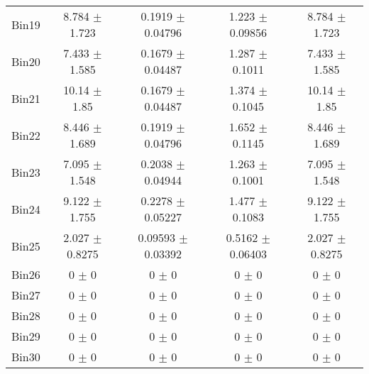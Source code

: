 \begin{tabular}{@{\extracolsep{4pt}}lcccc@{}}
     Bin19 & 8.784 $\pm$ 1.723 & 0.1919 $\pm$ 0.04796 & 1.223 $\pm$ 0.09856 & 8.784 $\pm$ 1.723 \\ 
     Bin20 & 7.433 $\pm$ 1.585 & 0.1679 $\pm$ 0.04487 & 1.287 $\pm$ 0.1011 & 7.433 $\pm$ 1.585 \\ 
     Bin21 & 10.14 $\pm$ 1.85 & 0.1679 $\pm$ 0.04487 & 1.374 $\pm$ 0.1045 & 10.14 $\pm$ 1.85 \\ 
     Bin22 & 8.446 $\pm$ 1.689 & 0.1919 $\pm$ 0.04796 & 1.652 $\pm$ 0.1145 & 8.446 $\pm$ 1.689 \\ 
     Bin23 & 7.095 $\pm$ 1.548 & 0.2038 $\pm$ 0.04944 & 1.263 $\pm$ 0.1001 & 7.095 $\pm$ 1.548 \\ 
     Bin24 & 9.122 $\pm$ 1.755 & 0.2278 $\pm$ 0.05227 & 1.477 $\pm$ 0.1083 & 9.122 $\pm$ 1.755 \\ 
     Bin25 & 2.027 $\pm$ 0.8275 & 0.09593 $\pm$ 0.03392 & 0.5162 $\pm$ 0.06403 & 2.027 $\pm$ 0.8275 \\ 
     Bin26 & 0 $\pm$ 0 & 0 $\pm$ 0 & 0 $\pm$ 0 & 0 $\pm$ 0 \\ 
     Bin27 & 0 $\pm$ 0 & 0 $\pm$ 0 & 0 $\pm$ 0 & 0 $\pm$ 0 \\ 
     Bin28 & 0 $\pm$ 0 & 0 $\pm$ 0 & 0 $\pm$ 0 & 0 $\pm$ 0 \\ 
     Bin29 & 0 $\pm$ 0 & 0 $\pm$ 0 & 0 $\pm$ 0 & 0 $\pm$ 0 \\ 
     Bin30 & 0 $\pm$ 0 & 0 $\pm$ 0 & 0 $\pm$ 0 & 0 $\pm$ 0 \\ 
\hline\hline
  \end{tabular}
